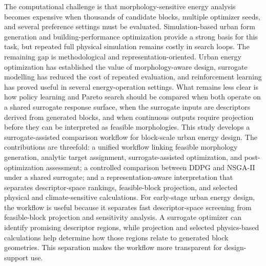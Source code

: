 \documentclass[10pt]{article}
\begin{document}
\begin{revisionbox}
The computational challenge is that morphology-sensitive energy analysis becomes expensive when thousands of candidate blocks, multiple optimizer seeds, and several preference settings must be evaluated. Simulation-based urban form generation and building-performance optimization provide a strong basis for this task, but repeated full physical simulation remains costly in search loops.
\revisionseparator
{}
The remaining gap is methodological and representation-oriented. Urban energy optimization has established the value of morphology-aware design, surrogate modelling has reduced the cost of repeated evaluation, and reinforcement learning has proved useful in several energy-operation settings. What remains less clear is how policy learning and Pareto search should be compared when both operate on a shared surrogate response surface, when the surrogate inputs are descriptors derived from generated blocks, and when continuous outputs require projection before they can be interpreted as feasible morphologies.
\revisionseparator
{}
This study develops a surrogate-assisted comparison workflow for block-scale urban energy design. The contributions are threefold: a unified workflow linking feasible morphology generation, analytic target assignment, surrogate-assisted optimization, and post-optimization assessment; a controlled comparison between DDPG and NSGA-II under a shared surrogate; and a representation-aware interpretation that separates descriptor-space rankings, feasible-block projection, and selected physical and climate-sensitive calculations.
\revisionseparator
{}
For early-stage urban energy design, the workflow is useful because it separates fast descriptor-space screening from feasible-block projection and sensitivity analysis. A surrogate optimizer can identify promising descriptor regions, while projection and selected physics-based calculations help determine how those regions relate to generated block geometries. This separation makes the workflow more transparent for design-support use.
\end{revisionbox}
\begin{responsereferences}
\end{responsereferences}
\end{document}
